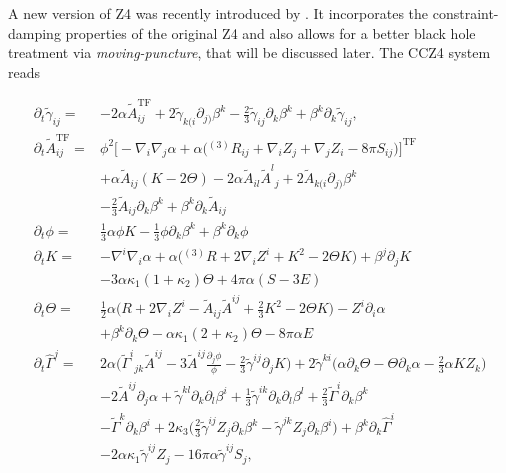 \documentclass[11pt,a4paper,headinclude=true,DIV=14,BCOR=8mm,chapterprefix,listof=totoc,twoside,openright,abstracton]{scrbook}
\begin{document}
A new version of Z4 was recently introduced by \cite{Alic:2011gg}. It incorporates the constraint-damping properties of the original Z4 and also allows for a better black hole treatment via \textit{moving-puncture}, that will be discussed later. 
The CCZ4 system reads 

\begin{align}
    \partial_{t}\widetilde{\gamma}_{ij} = & -2\alpha\widetilde{A}_{ij}^{\text{TF}} + 2\widetilde{\gamma}_{k(i}\partial_{j)}\beta^k - \frac{2}{3}\widetilde{\gamma}_{ij}\partial_k \beta^k + \beta^k\partial_k\widetilde{\gamma}_{ij}, \\
    \partial_{t}\widetilde{A}_{ij}^{\text{TF}} = & \phi^2\big[-\nabla_i\nabla_j\alpha + \alpha\big({^{(3)}R}_{ij}+\nabla_{i}Z_{j} + \nabla_{j}Z_{i}- 8\pi S_{ij}\big)\big]^{\text{TF}} \\
    & + \alpha\widetilde{A}_{ij}(K-2\Theta)-2\alpha\widetilde{A}_{il}{\widetilde{A}^l}_{j} + 2\widetilde{A}_{k(i}\partial_{j)}\beta^{k} \\
    & -\frac{2}{3}\widetilde{A}_{ij}\partial_{k}\beta^{k} + \beta^{k}\partial_{k}\widetilde{A}_{ij} \\
    \partial_{t} \phi = & \frac{1}{3}\alpha\phi K - \frac{1}{3}\phi\partial_{k}\beta^{k} + \beta^{k}\partial_{k}\phi \\
    \partial_{t}K = &-\nabla^{i}\nabla_{i}\alpha + \alpha\big({^{(3)}R} + 2\nabla_{i}Z^{i} + K^2 - 2\Theta K\big) + \beta^{j}\partial_{j}K \\
    & - 3\alpha\kappa_1(1+\kappa_2)\Theta + 4\pi\alpha (S-3E) \\
    \partial_{t}\Theta = &\frac{1}{2}\alpha\Big(R + 2\nabla_{i}Z^{i} - \widetilde{A}_{ij}\widetilde{A}^{ij} + \frac{2}{3}K^2 - 2\Theta K\Big) - Z^{i}\partial_{i}\alpha \\
    & + \beta^{k}\partial_{k}\Theta - \alpha\kappa_1(2 + \kappa_2)\Theta - 8\pi\alpha E \\
    \partial_{t}\hat{\Gamma}^j = & 2\alpha\Bigg({\widetilde{\Gamma}^i}_{jk}\widetilde{A}^{ij} - 3\widetilde{A}^{ij}\frac{\partial_{j}\phi}{\phi} -\frac{2}{3}\widetilde{\gamma}^{ij}\partial_{j}K\Bigg) + 2\widetilde{\gamma}^{ki}\Big(\alpha\partial_{k}\Theta - \Theta\partial_{k}\alpha - \frac{2}{3}\alpha K Z_{k}\Big) \\
    & - 2\widetilde{A}^{ij}\partial_{j}\alpha + \widetilde{\gamma}^{kl}\partial_{k}\partial_{l}\beta^{i} + \frac{1}{3} \widetilde{\gamma}^{ik}\partial_{k}\partial_{l}\beta^{l} + \frac{2}{3}\widetilde{\Gamma}^i\partial_{k}\beta^{k} \\
    & - \widetilde{\Gamma}^k\partial_{k}\beta^{i} + 2\kappa_3\Big(\frac{2}{3}\widetilde{\gamma}^{ij}Z_{j}\partial_{k}\beta^{k} - \widetilde{\gamma}^{jk}Z_{j}\partial_{k}\beta^{i}\Big) + \beta^{k}\partial_{k}\hat{\Gamma}^i \\
    & -2\alpha\kappa_1\widetilde{\gamma}^{ij}Z_{j}- 16\pi\alpha\widetilde{\gamma}^{ij}S_j,
\end{align}
\end{document}
